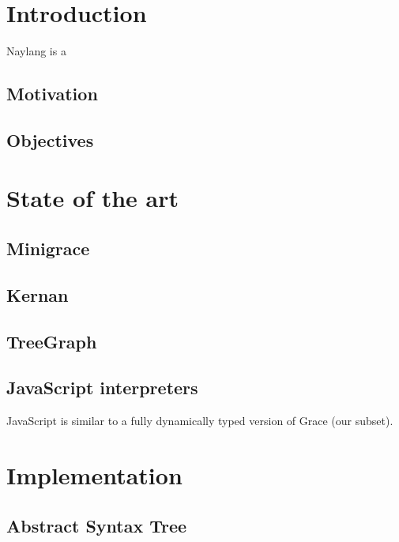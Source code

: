 \chapter{Introduction}\label{introduction}

Naylang is a

\section{Motivation}\label{motivation}

\section{Objectives}\label{objectives}

\chapter{State of the art}\label{state-of-the-art}

\section{Minigrace}\label{minigrace}

\section{Kernan}\label{kernan}

\section{TreeGraph}\label{treegraph}

\section{JavaScript interpreters}\label{javascript-interpreters}

JavaScript is similar to a fully dynamically typed version of Grace (our
subset).

\chapter{Implementation}\label{implementation}

\section{Abstract Syntax Tree}\label{abstract-syntax-tree}

